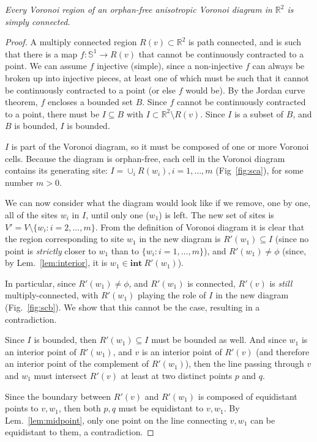 \documentclass[11pt]{article}
\begin{document}
\emph{Every Voronoi region of an orphan-free anisotropic Voronoi diagram in 
$\mathbb{R}^2$ is simply connected. 
}
\begin{proof}	
A multiply connected region $R(v)\subset\mathbb{R}^2$ is path connected, and is
such that there is a map
$f:\mathbb{S}^1\rightarrow R(v)$ that cannot be continuously contracted to a point. We
can assume $f$ injective (simple), since a non-injective $f$ can always be broken up
into injective pieces, at least one of which must be such that it cannot be
continuously contracted to a point (or else $f$ would be). 
By the Jordan curve theorem, $f$ encloses a bounded set $B$. Since $f$
cannot be continuously contracted to a point, there must be
$I\subseteq B$ with $I\subset\mathbb{R}^2\setminus R(v)$. Since $I$ is a subset of $B$, 
and $B$ is bounded, $I$ is bounded. 





$I$ is part of the Voronoi diagram, so it must be composed of one or more
Voronoi cells. Because the diagram is orphan-free, each cell in the Voronoi
diagram contains its generating site: $I=\displaystyle{\cup_i R(w_i)}, i=1,\dots,m$
(Fig~\ref{fig:sca}), for some number $m>0$. 


We can now consider what the diagram would look like if we remove, one by
one, all of the sites $w_i$ in $I$, until only
one ($w_1$) is left.
The new set of sites is $V'=V\setminus \{w_i : i=2,\dots,m\}$. 
	From the definition of Voronoi diagram it is clear that 
	the region corresponding to site $w_1$ in the new diagram is $R'(w_1)\subseteq I$
(since no point is \emph{strictly} closer to $w_1$ than to $\{w_i : i=1,\dots,m\}$), and
$R'(w_1)\ne\phi$
(since, by Lem.~\ref{lem:interior}, it is $w_1\in
\mathbf{int\ }{R'(w_1)}$). 


In particular, since $R'(w_1)\ne\phi$, and $R'(w_1)$ is connected, 
$R'(v)$ is \emph{still} multiply-connected,
with $R'(w_1)$ playing the role of $I$ in the new diagram (Fig.~\ref{fig:scb}). 
We show that this cannot be the case, resulting in a contradiction. 

Since $I$ is bounded, then $R'(w_1)\subseteq I$ must be bounded as well. 
And since $w_1$ is an interior point of $R'(w_1)$, and $v$ is 
an interior point of $R'(v)$ (and therefore an interior point of the complement of $R'(w_1)$), 
then the line passing through $v$ and $w_1$ must intersect $R'(v)$ at
least at two distinct points $p$ and $q$. 


Since the boundary between $R'(v)$ and $R'(w_1)$ is composed of
equidistant points to $v,w_1$, then both $p,q$ must be equidistant to $v,w_1$. 
By Lem.~\ref{lem:midpoint}, only one point on the line connecting $v,w_1$ can be equidistant to them, a contradiction. 




\end{proof}
\end{document}
